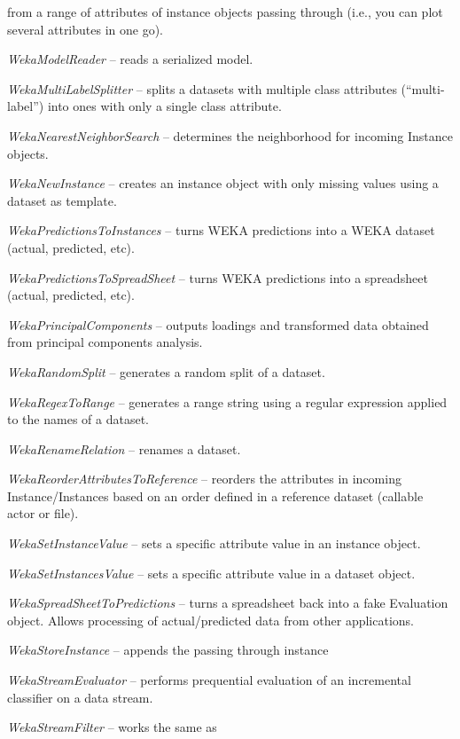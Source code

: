 \begin{tight_itemize}
	from a range of attributes of instance objects passing through (i.e., you 
	can plot several attributes in one go).
	\item \textit{WekaModelReader} -- reads a serialized model.
	\item \textit{WekaMultiLabelSplitter} -- splits a datasets with multiple
	class attributes (``multi-label'') into ones with only a single class 
	attribute.
	\item \textit{WekaNearestNeighborSearch} -- determines the neighborhood
	for incoming Instance objects.
	\item \textit{WekaNewInstance} -- creates an instance object with only
	missing values using a dataset as template.
	\item \textit{WekaPredictionsToInstances} -- turns WEKA predictions into
	a WEKA dataset (actual, predicted, etc).
	\item \textit{WekaPredictionsToSpreadSheet} -- turns WEKA predictions into
	a spreadsheet (actual, predicted, etc).
	\item \textit{WekaPrincipalComponents} -- outputs loadings and transformed
	data obtained from principal components analysis.
	\item \textit{WekaRandomSplit} -- generates a random split of a dataset.
	\item \textit{WekaRegexToRange} -- generates a range string using a regular
	expression applied to the names of a dataset.
	\item \textit{WekaRenameRelation} -- renames a dataset.
	\item \textit{WekaReorderAttributesToReference} -- reorders the attributes
	in incoming Instance/Instances based on an order defined in a reference
	dataset (callable actor or file).
	\item \textit{WekaSetInstanceValue} -- sets a specific attribute value in
	an instance object.
	\item \textit{WekaSetInstancesValue} -- sets a specific attribute value in
	a dataset object.
	\item \textit{WekaSpreadSheetToPredictions} -- turns a spreadsheet back
	into a fake Evaluation object. Allows processing of actual/predicted data
	from other applications.
	\item \textit{WekaStoreInstance} -- appends the passing through instance
	\item \textit{WekaStreamEvaluator} -- performs prequential evaluation
	of an incremental classifier on a data stream.
	\item \textit{WekaStreamFilter} -- works the same as

\end{tight_itemize}
